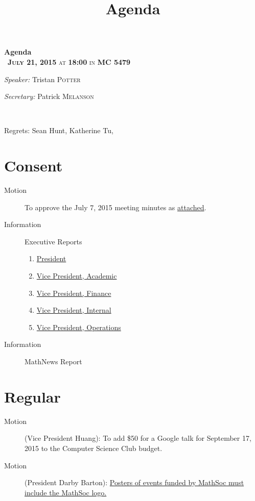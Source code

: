 \documentclass[12pt, letterpaper]{article}
\title{Agenda}
\newcommand{\meetingDate}{July 21, 2015}
\newcommand{\meetingTime}{18:00}
\newcommand{\meetingLocation}{MC 5479}
\begin{document}
\hypersetup{} %


\begin{center}
{ \huge \bfseries Agenda \\[0.4cm] }
{\textsc{~\textbf{\meetingDate} at \textbf{\meetingTime} in \textbf{\meetingLocation}}}
\\[0.2cm]

\begin{minipage}[t]{0.5\textwidth}
\begin{flushleft} \large
\emph{Speaker:}
Tristan \textsc{Potter}
\end{flushleft}
\end{minipage}%
\begin{minipage}[t]{0.5\textwidth}
\begin{flushright} \large
\emph{Secretary:} 
Patrick \textsc{Melanson}
\end{flushright}
\end{minipage}

\HRule \\[0.4cm]
\end{center}
Regrets: Sean Hunt, Katherine Tu, 

\section*{Consent}
\begin{description}
	\item[Motion] To approve the July 7, 2015 meeting minutes as \hyperref[minutes]{attached}.
	\item[Information] Executive Reports
	\begin{enumerate}
		\item \hyperref[president]{President}
		\item \hyperref[vpacademic]{Vice President, Academic}
		\item \hyperref[vpfinance]{Vice President, Finance}
		\item \hyperref[vpinternal]{Vice President, Internal}
		\item \hyperref[vpoperations]{Vice President, Operations}
	\end{enumerate}
	\item[Information] MathNews Report
\end{description}
\HRule

\section*{Regular}
\begin{description}
	\item[Motion] (Vice President Huang): To add \$50 for a Google talk for September 17, 2015 to the Computer Science Club budget.
	\item[Motion] (President Darby Barton): \hyperref[clubs]{Posters of events funded by MathSoc must include the MathSoc logo.}
\end{description}
\HRule
\end{document}
